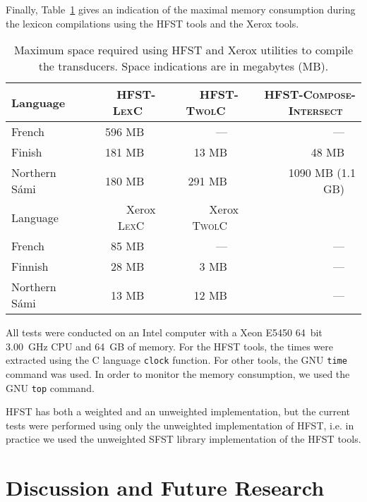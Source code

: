 \documentclass[postprint]{flammie}
\begin{document}
Finally, Table~\ref{fig:memory-consumption} gives an indication of the
maximal memory consumption during the lexicon compilations using the
\textsc{HFST} tools and the Xerox tools.

\begin{table}[!h]
  \begin{center}
    \begin{tabular}{lrrr}
      \hline
      Language & ~~\textsc{HFST-LexC}~~ & ~~\textsc{HFST-TwolC}~~ & ~~\textsc{HFST-Compose-Intersect}~~ \\
      \hline
      French & 596 MB~~ & ---~~ & ---~~ \\
      Finish & 181 MB~~ & 13 MB~~ & 48 MB~~ \\
      Northern S\'ami~~ & ~~180 MB~~ & ~~291 MB~~ & ~~1090 MB (1.1 GB)~~ \\
      \hline
      Language & ~~Xerox \textsc{LexC}~~ & ~~Xerox \textsc{TwolC}~~ & \\
      \hline
      French & ~~85 MB~~ & ~~---~~ & ~~---~~ \\
      Finnish & ~~28 MB~~ & ~~3 MB~~ & ~~---~~ \\
      Northern S\'ami~~ & ~~13 MB~~ & ~~12 MB~~ & ~~---~~ \\
      \hline
    \end{tabular}
    \vskip0.5cm
    \caption{Maximum space required using \textsc{HFST} and Xerox
    utilities to compile the transducers. Space indications are in
    megabytes (MB).}\label{fig:memory-consumption}
  \end{center}
\end{table}

All tests were conducted on an Intel computer with a Xeon E5450 64~bit
3.00~GHz CPU and 64~GB of memory. For the \textsc{HFST} tools, the
times were extracted using the C language \verb|clock| function. For
other tools, the GNU \verb|time| command was used. In order to monitor
the memory consumption, we used the GNU \verb|top| command.

\textsc{HFST} has both a weighted and an unweighted implementation,
but the current tests were performed using only the unweighted
implementation of \textsc{HFST}, i.e. in practice we used the
unweighted \textsc{SFST} library implementation of the \textsc{HFST}
tools.

\section{Discussion and Future Research}
\end{document}
